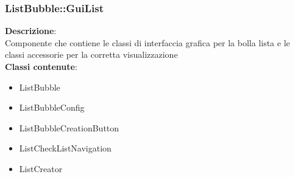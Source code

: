 \clearpage

\subsubsection{ListBubble::GuiList}
   \FloatBarrier
\FloatBarrier
\textbf{Descrizione}:\\
 Componente che contiene le classi di interfaccia grafica per la bolla lista e le classi accessorie per la corretta visualizzazione 
\\ \textbf{Classi contenute}:\\
\begin{itemize}
\item ListBubble
\item ListBubbleConfig
\item ListBubbleCreationButton
\item ListCheckListNavigation
\item ListCreator
\end{itemize}


\clearpage

